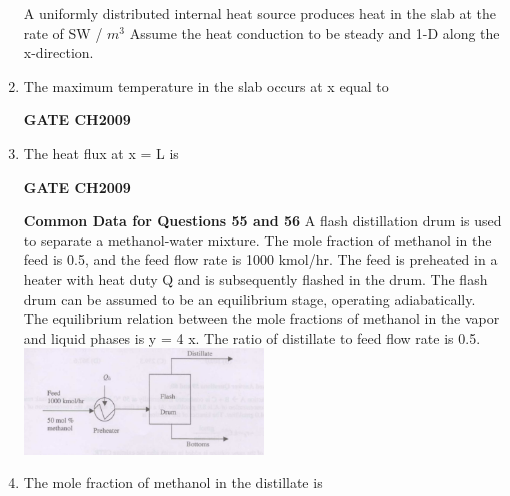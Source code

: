 \documentclass[journal,12pt,onecolumn]{IEEEtran}
\theoremstyle{remark}
\begin{document}
\begin{enumerate}
		A uniformly distributed internal heat source produces heat in the slab at the rate of SW / $m^3$ Assume the heat conduction to be steady and 1-D along the x-direction.
		
		\item The maximum temperature in the slab occurs at x equal to 
		\begin{enumerate}
		\end{enumerate}
		
		\hfill
		\textbf{GATE CH2009} 
		
		\item The heat flux at x = L is 
		\begin{enumerate}
			\begin{multicols}{4}
				\item 0
				\item S L/4
				\item S L/2
				\item S L
			\end{multicols}
		\end{enumerate}
		
		\hfill
		\textbf{GATE CH2009} 
		
		
		\textbf{Common Data for Questions 55 and 56}
		A flash distillation drum  is used to separate a methanol-water mixture. The mole fraction of methanol in the feed is 0.5, and the feed flow rate is 1000 kmol/hr. The feed is preheated in a heater with heat duty Q and is subsequently flashed in the drum. The flash drum can be assumed to be an equilibrium stage, operating adiabatically. The equilibrium relation between the mole fractions of methanol in the vapor and liquid phases is y = 4 x. The ratio of distillate to feed flow rate is 0.5.
		\\ \includegraphics[width=0.5\textwidth]{q55.png}
		
		\item The mole fraction of methanol in the distillate is
		\begin{enumerate}
			\begin{multicols}{4}
				\item 0.2
				\item 0.7
				\item 0.8
				\item 0.9
			\end{multicols}
		\end{enumerate}
		

\end{enumerate}
\end{document}
